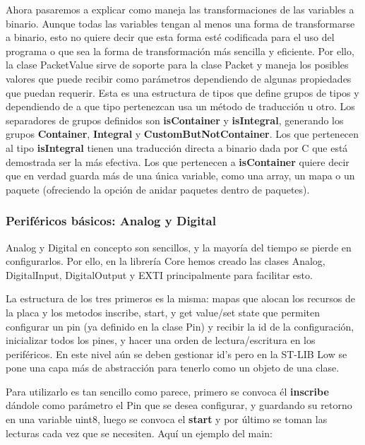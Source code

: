 \documentclass{report}
\begin{document}
\par \vspace{0.3 cm}
Ahora pasaremos a explicar como maneja las transformaciones de las variables a binario. Aunque todas las variables tengan al menos una forma de transformarse a binario, esto no quiere decir que esta forma esté codificada para el uso del programa o que sea la forma de transformación más sencilla y eficiente. Por ello, la clase PacketValue sirve de soporte para la clase Packet y maneja los posibles valores que puede recibir como parámetros dependiendo de algunas propiedades que puedan requerir. Esta es una estructura de tipos que define grupos de tipos y dependiendo de a que tipo pertenezcan usa un método de traducción u otro. Los separadores de grupos definidos son \textbf{isContainer} y \textbf{isIntegral}, generando los grupos \textbf{Container}, \textbf{Integral} y \textbf{CustomButNotContainer}. Los que pertenecen al tipo \textbf{isIntegral} tienen una traducción directa a binario dada por C que está demostrada ser la más efectiva. Los que pertenecen a \textbf{isContainer} quiere decir que en verdad guarda más de una única variable, como una array, un mapa o un paquete (ofreciendo la opción de anidar paquetes dentro de paquetes). 
\par \vspace{0.3 cm}

\subsubsection{Periféricos básicos: Analog y Digital}
Analog y Digital en concepto son sencillos, y la mayoría del tiempo se pierde en configurarlos. Por ello, en la librería Core hemos creado las clases Analog, DigitalInput, DigitalOutput y EXTI principalmente para facilitar esto. \par
La estructura de los tres primeros es la misma: mapas que alocan los recursos de la placa y los metodos inscribe, start, y get value/set state que permiten configurar un pin (ya definido en la clase Pin) y recibir la id de la configuración, inicializar todos los pines, y hacer una orden de lectura/escritura en los periféricos. En este nivel aún se deben gestionar id's pero en la ST-LIB Low se pone una capa más de abstracción para tenerlo como un objeto de una clase. 
\par \vspace{0.3 cm}
Para utilizarlo es tan sencillo como parece, primero se convoca él \textbf{inscribe} dándole como parámetro el Pin que se desea configurar, y guardando su retorno en una variable uint8, luego se convoca el \textbf{start} y por último se toman las lecturas cada vez que se necesiten. Aquí un ejemplo del main:
\end{document}
